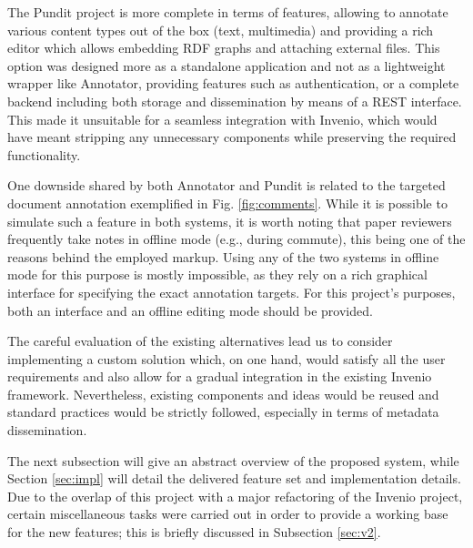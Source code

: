 The Pundit project is more complete in terms of features, allowing to annotate
various content types out of the box (text, multimedia) and providing a rich
editor which allows embedding RDF graphs and attaching external files. This
option was designed more as a standalone application and not as a lightweight
wrapper like Annotator, providing features such as authentication, or a
complete backend including both storage and dissemination by means of a REST
interface.  This made it unsuitable for a seamless integration with Invenio,
which would have meant stripping any unnecessary components while preserving
the required functionality.

One downside shared by both Annotator and Pundit is related to the targeted
document annotation exemplified in Fig. \ref{fig:comments}. While it is
possible to simulate such a feature in both systems, it is worth noting that
paper reviewers frequently take notes in offline mode (e.g., during commute),
this being one of the reasons behind the employed markup. Using any of the two
systems in offline mode for this purpose is mostly impossible, as they rely on
a rich graphical interface for specifying the exact annotation targets. For
this project's purposes, both an interface and an offline editing mode should
be provided.

The careful evaluation of the existing alternatives lead us to consider
implementing a custom solution which, on one hand, would satisfy all the user
requirements and also allow for a gradual integration in the existing Invenio
framework. Nevertheless, existing components and ideas would be reused and
standard practices would be strictly followed, especially in terms of metadata
dissemination.

The next subsection will give an abstract overview of the proposed system,
while Section \ref{sec:impl} will detail the delivered feature set and
implementation details. Due to the overlap of this project with a major
refactoring of the Invenio project, certain miscellaneous tasks were carried
out in order to provide a working base for the new features; this is briefly
discussed in Subsection \ref{sec:v2}.
